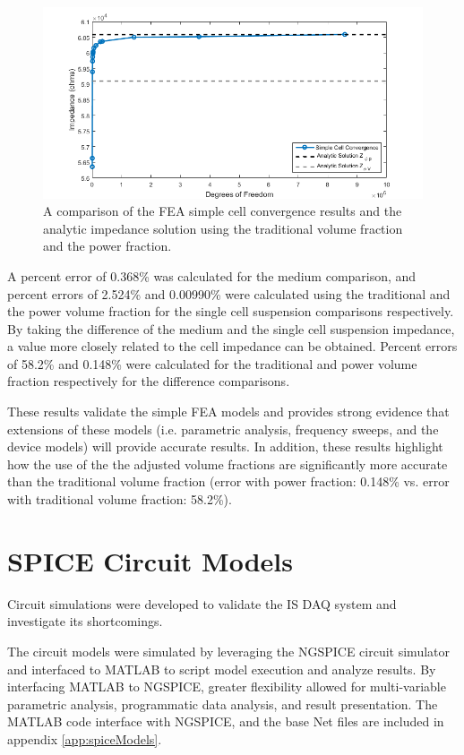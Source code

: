 \begin{figure}[h]
    \centering
    \includegraphics[width=\textwidth]{images/simpleCellValidation.png}
    \caption[Simple Cell validation]{A comparison of the FEA simple cell convergence results and the analytic impedance solution using the traditional volume fraction and the power fraction.}
    \label{fig:simple_cell_validation}
\end{figure}


\par A percent error of 0.368\% was calculated for the medium comparison, and percent errors of 2.524\% and 0.00990\% were calculated using the traditional and the power volume fraction for the single cell suspension comparisons respectively. By taking the difference of the medium and the single cell suspension impedance, a value more closely related to the cell impedance can be obtained. Percent errors of 58.2\% and 0.148\% were calculated for the traditional and power volume fraction respectively for the difference comparisons.

\par These results validate the simple FEA models and provides strong evidence that extensions of these models (i.e. parametric analysis, frequency sweeps, and the device models) will provide accurate results. In addition, these results highlight how the use of the the adjusted volume fractions are significantly more accurate than the traditional volume fraction (error with power fraction: 0.148\% vs. error with traditional volume fraction: 58.2\%). 






\section{SPICE Circuit Models}
\par  Circuit simulations were developed to validate the IS DAQ system and investigate its shortcomings.

\par The circuit models were simulated by leveraging the NGSPICE circuit simulator and interfaced to MATLAB to script model execution and analyze results. By interfacing MATLAB to NGSPICE, greater flexibility allowed for multi-variable parametric analysis, programmatic data analysis, and result presentation. The MATLAB code interface with NGSPICE, and the base Net files are included in appendix \ref{app:spiceModels}. 


